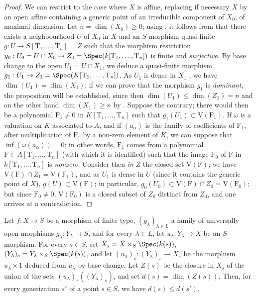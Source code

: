 \begin{proof}
We can restrict to the case where $X$ is affine, replacing if necessary $X$ by an open affine containing a generic point of an irreducible component of $X_0$, of maximal dimension.
Let $n=\dim(X_0)\geq 0$; using , it follows from  that there exists a neighbourhood $U$ of $X_0$ in $X$ and an $S$-morphism quasi-finite $g:U\to S[\mathrm{T}_1,\ldots,\mathrm{T}_n]=Z$ such that the morphism restriction $g_0:U_0=U\cap X_0\to Z_0=\Spec(k[\mathrm{T}_1,\ldots,\mathrm{T}_n])$ is finite and \emph{surjective}.
By base change to the open $U_1=U\cap X_1$, we deduce a quasi-finite morphism $g_1:U_1\to Z_1=\Spec(K[\mathrm{T}_1,\ldots,\mathrm{T}_n])$.
As $U_1$ is dense in $X_1$ , we have $\dim(U_1)=\dim(X_1)$; if we can prove that the morphism $g_1$ is \emph{dominant}, the proposition will be established, since then $\dim(U_1)\leq\dim(Z_1)=n$ and on the other hand $\dim(X_1)\geq n$ by .
Suppose the contrary; there would then be a polynomial $\mathrm{F}_1\neq 0$ in $K[\mathrm{T}_1,\ldots,\mathrm{T}_n]$ such that $g_1(U_1)\subset\mathrm{V}(\mathrm{F}_1)$.
If $\omega$ is a valuation on $K$ associated to $A$, and if $(a_\alpha)$ is the family of coefficients of $\mathrm{F}_1$, after multiplication of $\mathrm{F}_1$ by a non-zero element of $K$, we can suppose that $\inf(\omega(a_\alpha))=0$; in other words, $\mathrm{F}_1$ comes from a polynomial $\mathrm{F}\in A[\mathrm{T}_1,\ldots,\mathrm{T}_n]$ (with which it is identified) such that the image $\mathrm{F}_0$ of $\mathrm{F}$ in $k[\mathrm{T}_1,\ldots,\mathrm{T}_n]$ is \emph{nonzero}.
Consider then \emph{in} $Z$ the closed set $\mathrm{V}(\mathrm{F})$; we have $\mathrm{V}(\mathrm{F})\cap Z_1=\mathrm{V}(\mathrm{F}_1)$, and as $U_1$
is dense in $U$ (since it contains the generic point of $X$), $g(U)\subset\mathrm{V}(\mathrm{F})$; in particular, $g_0(U_0)\subset\mathrm{V}(\mathrm{F})\cap Z_0=\mathrm{V}(\mathrm{F}_0)$; but since $\mathrm{F}_0\neq 0$, $\mathrm{V}(\mathrm{F}_0)$ is a closed subset of $Z_0$ distinct from $Z_0$, and one arrives at a contradiction.
\end{proof}

\begin{proposition}[14.3.11]
\label{IV.14.3.11}
Let $f:X\to S$ be a morphism of finite type, $(g_\lambda)_{\lambda\in L}$ a family of universally open morphisms $g_\lambda:Y_\lambda\to S$, and for every $\lambda\in L$, let $u_\lambda:Y_\lambda\to X$ be an $S$-morphism.
For every $s\in S$, set $X_s=X\times_S\Spec(k(s))$, $(Y_\lambda)_s=Y_\lambda\times_S\Spec(k(s))$, and let $(u_\lambda)_s:(Y_\lambda)_s\to X_s$ be the morphism $u_\lambda\times 1$ deduced from $u_\lambda$ by base change.
Let $Z(s)$ be the closure in $X_s$ of the union of the sets $(u_\lambda)_s((Y_\lambda)_s)$, and set $d(s)=\dim(Z(s))$.
Then, for every generization $s'$ of a point $s\in S$, we have $d(s)\leq d(s')$.
\end{proposition}

